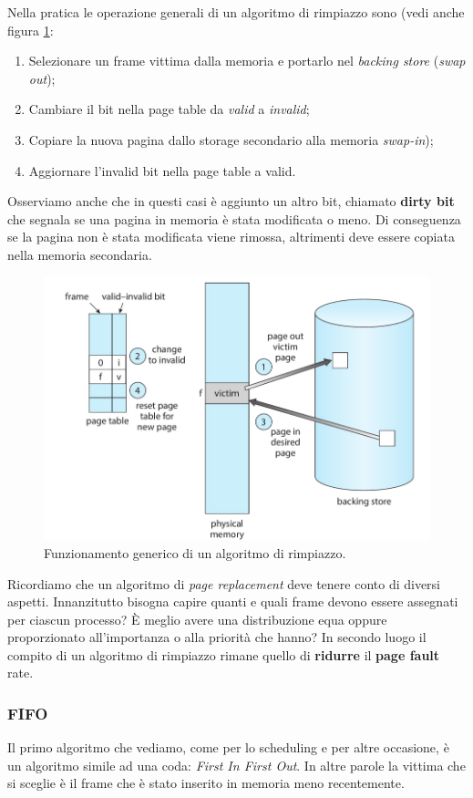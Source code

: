 Nella pratica le operazione generali di un algoritmo di rimpiazzo sono (vedi anche figura \ref{fig:replacement_algorithm}:
\vspace{-5px}
\begin{enumerate}
\setlength{\itemsep}{-.25 em}
    \item Selezionare un frame vittima dalla memoria e portarlo nel \textit{backing store} (\textit{swap out});
    \item Cambiare il bit nella page table da \textit{valid} a \textit{invalid};
    \item Copiare la nuova pagina dallo storage secondario alla memoria \textit{swap-in}); 
    \item Aggiornare l'invalid bit nella page table a valid.
\end{enumerate}
Osserviamo anche che in questi casi è aggiunto un altro bit, chiamato \textbf{dirty bit} che segnala se una pagina in memoria è stata modificata o meno. Di conseguenza se la pagina non è stata modificata viene rimossa, altrimenti deve essere copiata nella memoria secondaria. 
\begin{figure}[h]
    \centering
    \includegraphics[width = .65\textwidth]{../res/imgs/virtual memory/replacement_algorithm.png}
    \caption{Funzionamento generico di un algoritmo di rimpiazzo.}
    \label{fig:replacement_algorithm}
\end{figure}

Ricordiamo che un algoritmo di \textit{page replacement} deve tenere conto di diversi aspetti. Innanzitutto bisogna capire quanti e quali frame devono essere assegnati per ciascun processo? È meglio avere una distribuzione equa oppure proporzionato all'importanza o alla priorità che hanno? In secondo luogo il compito di un algoritmo di rimpiazzo rimane quello di \textbf{ridurre} il \textbf{page fault} rate.

% 
\subsubsection{FIFO}
Il primo algoritmo che vediamo, come per lo scheduling e per altre occasione, è un algoritmo simile ad una coda: \textit{First In First Out}. In altre parole la vittima che si sceglie è il frame che è stato inserito in memoria meno recentemente.

